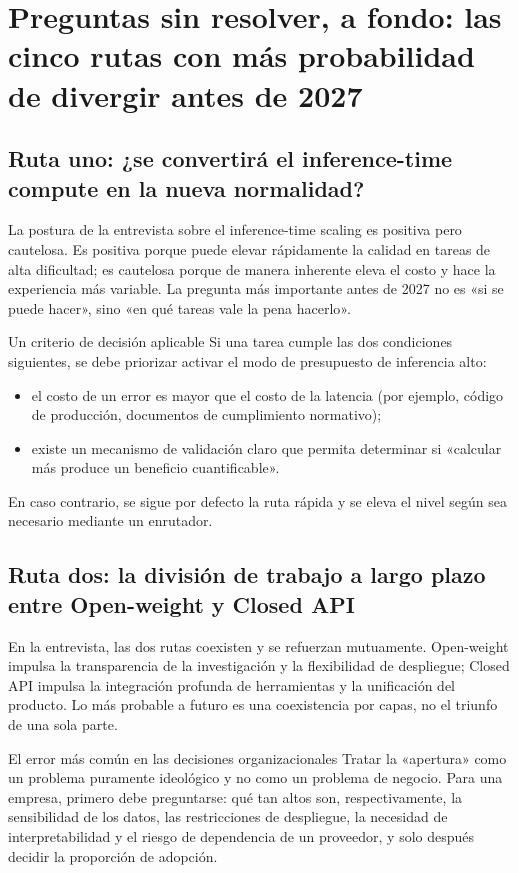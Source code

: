 \section{Preguntas sin resolver, a fondo: las cinco rutas con más probabilidad de divergir antes de 2027}

\subsection{Ruta uno: ¿se convertirá el inference-time compute en la nueva normalidad?}

La postura de la entrevista sobre el inference-time scaling es positiva pero cautelosa. Es positiva porque puede elevar rápidamente la calidad en tareas de alta dificultad; es cautelosa porque de manera inherente eleva el costo y hace la experiencia más variable. La pregunta más importante antes de 2027 no es «si se puede hacer», sino «en qué tareas vale la pena hacerlo».

\begin{importantbox}{Un criterio de decisión aplicable}
Si una tarea cumple las dos condiciones siguientes, se debe priorizar activar el modo de presupuesto de inferencia alto:
\begin{itemize}[leftmargin=1.5em]
    \item el costo de un error es mayor que el costo de la latencia (por ejemplo, código de producción, documentos de cumplimiento normativo);
    \item existe un mecanismo de validación claro que permita determinar si «calcular más produce un beneficio cuantificable».
\end{itemize}
En caso contrario, se sigue por defecto la ruta rápida y se eleva el nivel según sea necesario mediante un enrutador.
\end{importantbox}

\subsection{Ruta dos: la división de trabajo a largo plazo entre Open-weight y Closed API}

En la entrevista, las dos rutas coexisten y se refuerzan mutuamente. Open-weight impulsa la transparencia de la investigación y la flexibilidad de despliegue; Closed API impulsa la integración profunda de herramientas y la unificación del producto. Lo más probable a futuro es una coexistencia por capas, no el triunfo de una sola parte.

\begin{warningbox}{El error más común en las decisiones organizacionales}
Tratar la «apertura» como un problema puramente ideológico y no como un problema de negocio. Para una empresa, primero debe preguntarse: qué tan altos son, respectivamente, la sensibilidad de los datos, las restricciones de despliegue, la necesidad de interpretabilidad y el riesgo de dependencia de un proveedor, y solo después decidir la proporción de adopción.
\end{warningbox}

